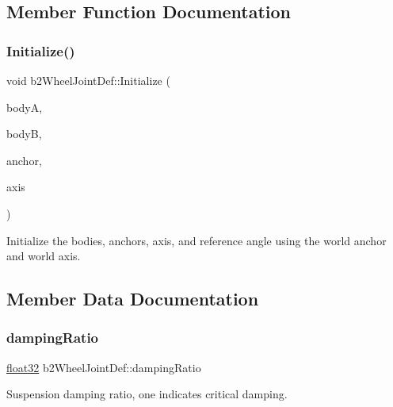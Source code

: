 \subsection{Member Function Documentation}
\mbox{\label{structb2_wheel_joint_def_af26887092d36c3cd03898401a38783e2}} 
\subsubsection{\texorpdfstring{Initialize()}{Initialize()}}
{\footnotesize\ttfamily void b2\+Wheel\+Joint\+Def\+::\+Initialize (\begin{DoxyParamCaption}\item[{\mbox{\hyperlink{classb2_body}{b2\+Body}} $\ast$}]{bodyA,  }\item[{\mbox{\hyperlink{classb2_body}{b2\+Body}} $\ast$}]{bodyB,  }\item[{const \mbox{\hyperlink{structb2_vec2}{b2\+Vec2}} \&}]{anchor,  }\item[{const \mbox{\hyperlink{structb2_vec2}{b2\+Vec2}} \&}]{axis }\end{DoxyParamCaption})}

Initialize the bodies, anchors, axis, and reference angle using the world anchor and world axis. 

\subsection{Member Data Documentation}
\mbox{\label{structb2_wheel_joint_def_a9976584bfee18b46dec355764797ce54}} 
\subsubsection{\texorpdfstring{dampingRatio}{dampingRatio}}
{\footnotesize\ttfamily \mbox{\hyperlink{b2_settings_8h_aacdc525d6f7bddb3ae95d5c311bd06a1}{float32}} b2\+Wheel\+Joint\+Def\+::damping\+Ratio}



Suspension damping ratio, one indicates critical damping. 

\mbox{\label{structb2_wheel_joint_def_a8e7193d6c34c784ffd71e79d3a70acc6}} 
